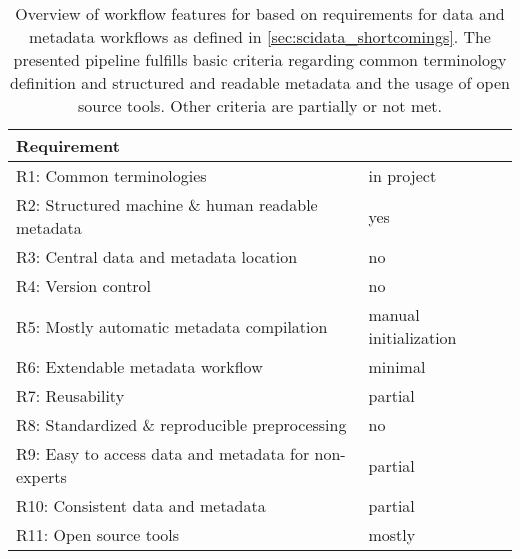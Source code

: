 \begin{table}[]
\begin{tabular}{|l|l|}
\hline
Requirement                                          &  \cite{Brochier_2018} \\  \hline
R1: Common terminologies                             &  in project \\ \hline
R2: Structured machine \& human readable metadata    &  yes \\ \hline
R3: Central data and metadata location               &  no \\ \hline
R4: Version control                                  &  no \\ \hline
R5: Mostly automatic metadata compilation            &  manual initialization \\ \hline
R6: Extendable metadata workflow                     &  minimal \\ \hline
R7: Reusability                                      &  partial \\ \hline
R8: Standardized \& reproducible preprocessing       &  no \\ \hline
R9: Easy to access data and metadata for non-experts &  partial \\ \hline
R10: Consistent data and metadata                    &  partial \\ \hline
R11: Open source tools                               &  mostly \\ \hline
\end{tabular}
\caption[Overview of workflow features for \cite{Brochier_2018}]{Overview of workflow features for \cite{Brochier_2018} based on requirements for data and metadata workflows as defined in \cref{sec:scidata_shortcomings}. The presented pipeline fulfills basic criteria regarding common terminology definition and structured and readable metadata and the usage of open source tools. Other criteria are partially or not met.}
\label{tab:requirement_check_scidata}
\end{table}
